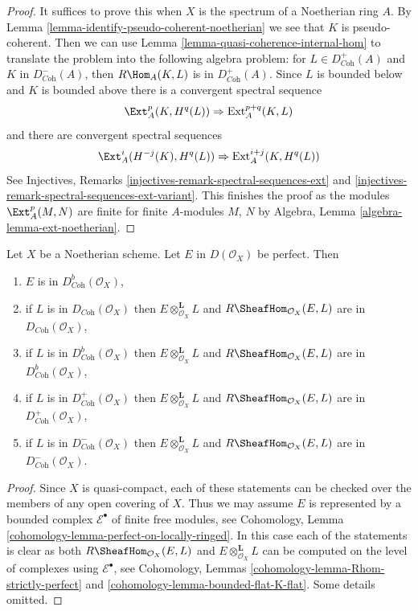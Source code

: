 \begin{proof}
It suffices to prove this when $X$ is the spectrum of
a Noetherian ring $A$.
By Lemma \ref{lemma-identify-pseudo-coherent-noetherian}
we see that $K$ is pseudo-coherent.
Then we can use Lemma \ref{lemma-quasi-coherence-internal-hom}
to translate the problem into the following algebra problem:
for $L \in D^+_{\textit{Coh}}(A)$ and $K$ in $D^-_{\textit{Coh}}(A)$, then
$R\Hom_A(K, L)$ is in $D^+_{\textit{Coh}}(A)$.
Since $L$ is bounded below and $K$ is bounded above there is a
convergent spectral sequence
$$
\Ext^p_A(K, H^q(L)) \Rightarrow \text{Ext}^{p + q}_A(K, L)
$$
and there are convergent spectral sequences
$$
\Ext^i_A(H^{-j}(K), H^q(L)) \Rightarrow \text{Ext}^{i + j}_A(K, H^q(L))
$$
See Injectives, Remarks \ref{injectives-remark-spectral-sequences-ext}
and \ref{injectives-remark-spectral-sequences-ext-variant}.
This finishes the proof as the modules $\Ext^p_A(M, N)$
are finite for finite $A$-modules $M$, $N$ by
Algebra, Lemma \ref{algebra-lemma-ext-noetherian}.
\end{proof}

\begin{lemma}
\label{lemma-perfect-on-noetherian}
Let $X$ be a Noetherian scheme. Let $E$ in $D(\mathcal{O}_X)$ be perfect.
Then
\begin{enumerate}
\item $E$ is in $D^b_{\textit{Coh}}(\mathcal{O}_X)$,
\item if $L$ is in $D_{\textit{Coh}}(\mathcal{O}_X)$ then
$E \otimes_{\mathcal{O}_X}^\mathbf{L} L$ and
$R\SheafHom_{\mathcal{O}_X}(E, L)$ are in
$D_{\textit{Coh}}(\mathcal{O}_X)$,
\item if $L$ is in $D^b_{\textit{Coh}}(\mathcal{O}_X)$ then
$E \otimes_{\mathcal{O}_X}^\mathbf{L} L$ and
$R\SheafHom_{\mathcal{O}_X}(E, L)$ are in
$D^b_{\textit{Coh}}(\mathcal{O}_X)$,
\item if $L$ is in $D^+_{\textit{Coh}}(\mathcal{O}_X)$ then
$E \otimes_{\mathcal{O}_X}^\mathbf{L} L$ and
$R\SheafHom_{\mathcal{O}_X}(E, L)$ are in
$D^+_{\textit{Coh}}(\mathcal{O}_X)$,
\item if $L$ is in $D^-_{\textit{Coh}}(\mathcal{O}_X)$ then
$E \otimes_{\mathcal{O}_X}^\mathbf{L} L$ and
$R\SheafHom_{\mathcal{O}_X}(E, L)$ are in
$D^-_{\textit{Coh}}(\mathcal{O}_X)$.
\end{enumerate}
\end{lemma}

\begin{proof}
Since $X$ is quasi-compact, each of these statements can be checked
over the members of any open covering of $X$.
Thus we may assume $E$ is represented by
a bounded complex $\mathcal{E}^\bullet$ of finite free modules, see
Cohomology, Lemma \ref{cohomology-lemma-perfect-on-locally-ringed}.
In this case each of the statements is clear as both
$R\SheafHom_{\mathcal{O}_X}(E, L)$
and $E \otimes_{\mathcal{O}_X}^\mathbf{L} L$ can be computed on the
level of complexes using $\mathcal{E}^\bullet$, see
Cohomology, Lemmas \ref{cohomology-lemma-Rhom-strictly-perfect} and
\ref{cohomology-lemma-bounded-flat-K-flat}. Some details omitted.
\end{proof}

